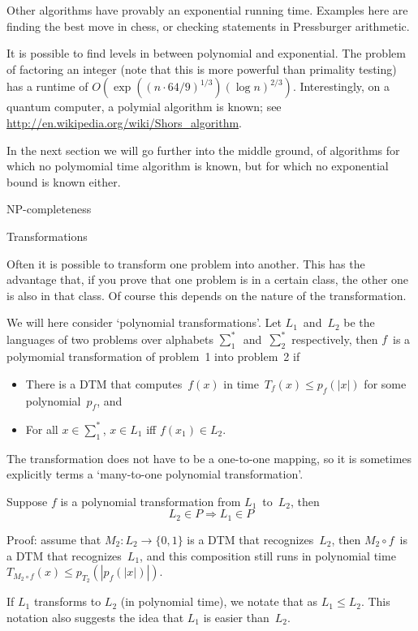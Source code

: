 Other algorithms have provably an exponential running time. Examples
here are finding the best move in chess, or checking statements in
Pressburger arithmetic.

It is possible to find levels in between polynomial and
exponential. The problem of factoring an integer (note that this is
more powerful than primality testing) has a runtime of
$O(\exp((n\cdot 64/9)^{1/3})(\log n)^{2/3})$. Interestingly, on a quantum
computer, a polymial algorithm is known; see
\url{http://en.wikipedia.org/wiki/Shors_algorithm}.

In the next section we will go further into the middle ground, of
algorithms for which no polymomial time algorithm is known, but for
which no exponential bound is known either.

 {NP-completeness}

 {Transformations}

Often it is possible to transform one problem into another. This has
the advantage that, if you prove that one problem is in a certain
class, the other one is also in that class. Of course this depends on
the nature of the transformation.

We will here consider `polynomial transformations'. Let $L_1$~and~$L_2$
be the languages of two problems over alphabets
$\sum_1^*$~and~$\sum_2^*$ respectively, then $f$~is a polymomial
transformation of problem~1 into problem~2 if
\begin{itemize}
\item There is a DTM that computes~$f(x)$ in time~$T_f(x)\leq p_f(|x|)$ for
  some polynomial~$p_f$, and
\item For all $x\in\sum_1^*$, $x\in L_1$ iff $f(x_1)\in L_2$.
\end{itemize}
The transformation does not have to be a one-to-one mapping, so it is
sometimes explicitly terms a `many-to-one polynomial transformation'.

\begin{lemma}
Suppose $f$ is a polynomial transformation from $L_1$~to~$L_2$,
then \[ L_2\in P\Rightarrow L_1\in P \]
\end{lemma}
Proof: assume that $M_2:L_2\rightarrow\{0,1\}$ is a DTM that
recognizes~$L_2$, then $M_2\circ f$~is a DTM that recognizes~$L_1$,
and this composition still runs in polynomial time~$T_{M_2\circ
  f}(x)\leq p_{T_2}(|p_f(|x|)|)$.

If $L_1$ transforms to $L_2$ (in polynomial time), we notate that as
$L_1\leq L_2$. This notation also suggests the idea that $L_1$ is
easier than~$L_2$.

